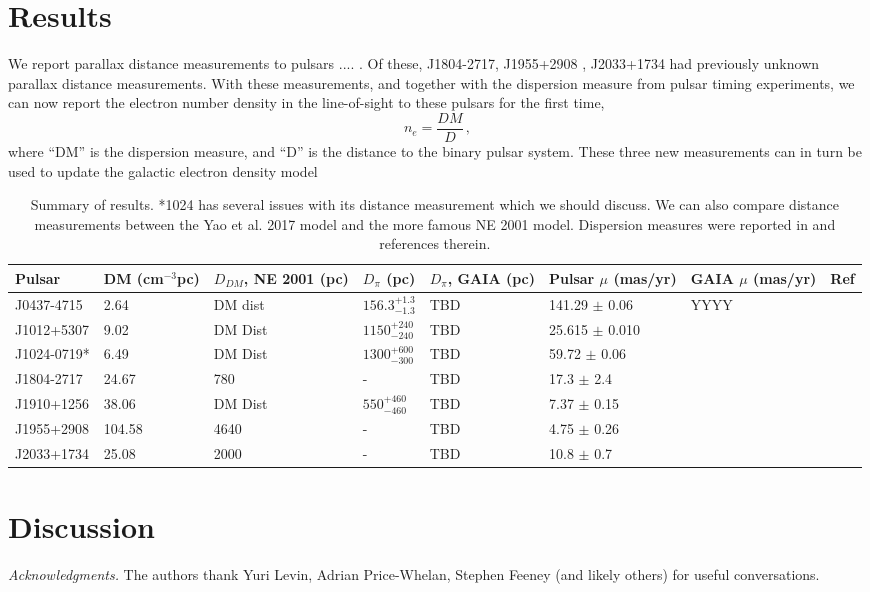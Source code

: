 \documentclass[iop,apj]{emulateapj}
\def\beq{\begin{equation}}
\def\eeq{\end{equation}}
\begin{document}
\section{Results}
We report parallax distance measurements to pulsars .... . Of these,  J1804-2717,  J1955+2908 ,  J2033+1734 had previously unknown parallax distance measurements. With these measurements, and together with the dispersion measure from pulsar timing experiments, we can now report the electron number density in the line-of-sight to these pulsars for the first time,
\beq
n_e = \frac{DM}{D}\, ,
\eeq
where ``DM'' is the dispersion measure, and ``D'' is the distance to the binary pulsar system. These three new measurements can in turn be used to update the galactic electron density model~\cite{cl02,cl03, ymw+17}
\begin{table*}[h]
\begin{center}
\caption{\label{tab:results} Summary of results. *1024 has several issues with its distance measurement which we should discuss. We can also compare distance measurements between the Yao et al. 2017 model and the more famous NE 2001 model. Dispersion measures were reported in \cite{v+16} and references therein.}
\begin{tabular}{@{\;\;}l@{\;\;}l@{\;}l@{\;}l@{\;}l@{\;}l@{\;}l@{\;}c@{\;}}
\hline\hline
Pulsar 		& DM (cm$^{-3}$pc)		& $D_{DM}$, NE 2001 (pc) & $D_\pi$ (pc) & $D_\pi$, GAIA (pc) & Pulsar $\mu$ (mas/yr) 	& GAIA $\mu$ (mas/yr)& Ref\\
\hline
J0437-4715 	& 2.64  	& DM dist 			& $156.3^{+1.3}_{-1.3}$ 	&TBD			 	&	141.29 $\pm$ 0.06 	&  YYYY 	&	\cite{v+16, dvt+08, dcl+16}\\
 J1012+5307 	& 9.02	& DM Dist			& $1150^{+240}_{-240}$	&TBD				&	25.615 $\pm$ 0.010	&		& 	\cite{v+16, dcl+16}\\
 J1024-0719* 	& 6.49	& DM Dist			& $1300^{+600}_{-300}$	&TBD				&	59.72 $\pm$ 0.06	&		& 	\cite{v+16, kkn+16, dcl+16}\\
 J1804-2717 	& 24.67	& 780			& -					&TBD				&	17.3 $\pm$ 2.4		&		& 	\cite{v+16, dcl+16}\\
 J1910+1256 	& 38.06	& DM Dist			& $550^{+460}_{-460}$	&TBD				&	7.37 $\pm$ 0.15	&		&	\cite{v+16, dcl+16}\\
 J1955+2908 	&104.58	& 4640			& -					&TBD				&	4.75 $\pm$ 0.26	&		& 	\cite{v+16, dcl+16}\\
 J2033+1734 	& 25.08	& 2000			& -					&TBD				&	10.8 $\pm$ 0.7		&		& 	\cite{v+16, dcl+16}\\
 \hline \hline
 \end{tabular}
\end{center}
\end{table*}
%

\section{Discussion}



\acknowledgements

\emph{Acknowledgments.}
The authors thank Yuri Levin, Adrian Price-Whelan, Stephen Feeney (and likely others) for useful conversations.






\end{document}
